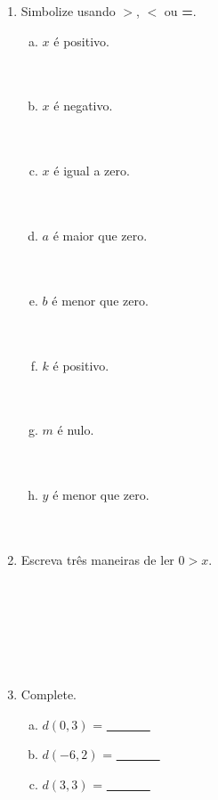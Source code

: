 \documentclass[a4paper,14pt]{article}
\begin{document}
\begin{multicols}{2}
\begin{enumerate}
\begin{enumerate}[a)]
			\end{enumerate}
			\item Simbolize usando \textbf{$>$}, \textbf{$<$} ou \textbf{=}.
			\begin{enumerate}[a)]
				\item $x$ é positivo. \\\\\\
				\item $x$ é negativo. \\\\\\
				\item $x$ é igual a zero. \\\\\\
				\item $a$ é maior que zero. \\\\\\
				\item $b$ é menor que zero. \\\\\\
				\item $k$ é positivo. \\\\\\
				\item $m$ é nulo. \\\\\\
				\item $y$ é menor que zero. \\\\\\
			\end{enumerate}
			\item Escreva três maneiras de ler $0 > x$. \\\\\\\\\\\\\\
			\item Complete.
			\begin{enumerate}[a)]
				\item $d(0, 3)$ =  \underline{~~~~~~~} 
				\item $d(-6, 2)$ =  \underline{~~~~~~~} 
				\item $d(3, 3)$ =  \underline{~~~~~~~} 

\end{enumerate}
\end{enumerate}
\end{multicols}
\end{document}
